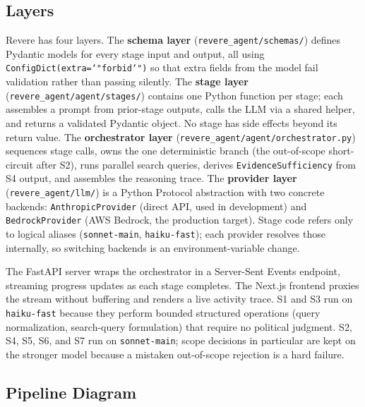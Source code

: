 \documentclass[11pt,letterpaper]{article}
\newcommand{\kw}[1]{\textbf{#1}}
\newcommand{\code}[1]{\texttt{\small #1}}
\newcommand{\file}[1]{\texttt{\small #1}}
\begin{document}
\subsection{Layers}

Revere has four layers. The \kw{schema layer} (\file{revere\_agent/schemas/})
defines Pydantic models for every stage input and output, all using
\code{ConfigDict(extra=\char`"forbid\char`")} so that extra fields from the
model fail validation rather than passing silently. The \kw{stage layer}
(\file{revere\_agent/agent/stages/}) contains one Python function per stage;
each assembles a prompt from prior-stage outputs, calls the LLM via a shared
helper, and returns a validated Pydantic object. No stage has side effects
beyond its return value. The \kw{orchestrator layer}
(\file{revere\_agent/agent/orchestrator.py}) sequences stage calls, owns the
one deterministic branch (the out-of-scope short-circuit after S2), runs
parallel search queries, derives \code{EvidenceSufficiency} from S4 output,
and assembles the reasoning trace. The \kw{provider layer}
(\file{revere\_agent/llm/}) is a Python Protocol abstraction with two concrete
backends: \code{AnthropicProvider} (direct API, used in development) and
\code{BedrockProvider} (AWS Bedrock, the production target). Stage code refers
only to logical aliases (\code{sonnet-main}, \code{haiku-fast}); each provider
resolves those internally, so switching backends is an environment-variable
change.

The FastAPI server wraps the orchestrator in a Server-Sent Events endpoint,
streaming progress updates as each stage completes. The Next.js frontend
proxies the stream without buffering and renders a live activity trace. S1 and
S3 run on \code{haiku-fast} because they perform bounded structured operations
(query normalization, search-query formulation) that require no political
judgment. S2, S4, S5, S6, and S7 run on \code{sonnet-main}; scope decisions
in particular are kept on the stronger model because a mistaken out-of-scope
rejection is a hard failure.

\subsection{Pipeline Diagram}
\end{document}
